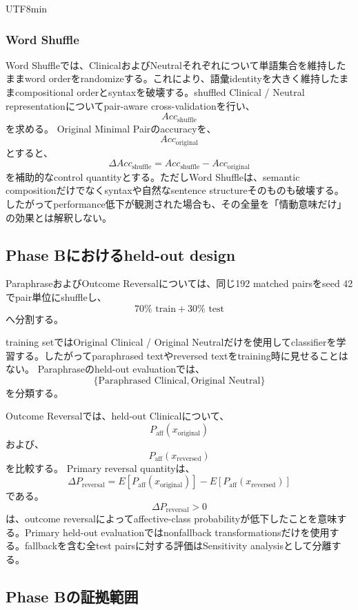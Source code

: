 \documentclass{article} %
\begin{document}
\begin{CJK*}{UTF8}{min}
\subsubsection{Word Shuffle}

Word Shuffleでは、ClinicalおよびNeutralそれぞれについて単語集合を維持したままword orderをrandomizeする。これにより、語彙identityを大きく維持したままcompositional orderとsyntaxを破壊する。shuffled Clinical / Neutral representationについてpair-aware cross-validationを行い、
\[
Acc_{\mathrm{shuffle}}
\]
を求める。
Original Minimal Pairのaccuracyを、
\[
Acc_{\mathrm{original}}
\]
とすると、
\[
\Delta Acc_{\mathrm{shuffle}}
=
Acc_{\mathrm{shuffle}}
-
Acc_{\mathrm{original}}
\]
を補助的なcontrol quantityとする。ただしWord Shuffleは、semantic compositionだけでなくsyntaxや自然なsentence structureそのものも破壊する。したがってperformance低下が観測された場合も、その全量を「情動意味だけ」の効果とは解釈しない。


\subsection{Phase Bにおけるheld-out design}

ParaphraseおよびOutcome Reversalについては、同じ192 matched pairsをseed 42でpair単位にshuffleし、
\[
70\%\text{ train}
+
30\%\text{ test}
\]
へ分割する。

training setではOriginal Clinical / Original Neutralだけを使用してclassifierを学習する。したがってparaphrased textやreversed textをtraining時に見せることはない。
Paraphraseのheld-out evaluationでは、
\[
\{
\text{Paraphrased Clinical},
\text{Original Neutral}
\}
\]
を分類する。

Outcome Reversalでは、held-out Clinicalについて、
\[
P_{\mathrm{aff}}
(
x_{\mathrm{original}}
)
\]
および、
\[
P_{\mathrm{aff}}
(
x_{\mathrm{reversed}}
)
\]
を比較する。
Primary reversal quantityは、
\[
\Delta P_{\mathrm{reversal}}
=
E[
P_{\mathrm{aff}}
(
x_{\mathrm{original}}
)
]
-
E[
P_{\mathrm{aff}}
(
x_{\mathrm{reversed}}
)
]
\]
である。
\[
\Delta P_{\mathrm{reversal}}>0
\]
は、outcome reversalによってaffective-class probabilityが低下したことを意味する。Primary held-out evaluationではnonfallback transformationsだけを使用する。fallbackを含む全test pairsに対する評価はSensitivity analysisとして分離する。



\subsection{Phase Bの証拠範囲}


\end{CJK*}
\end{document}
